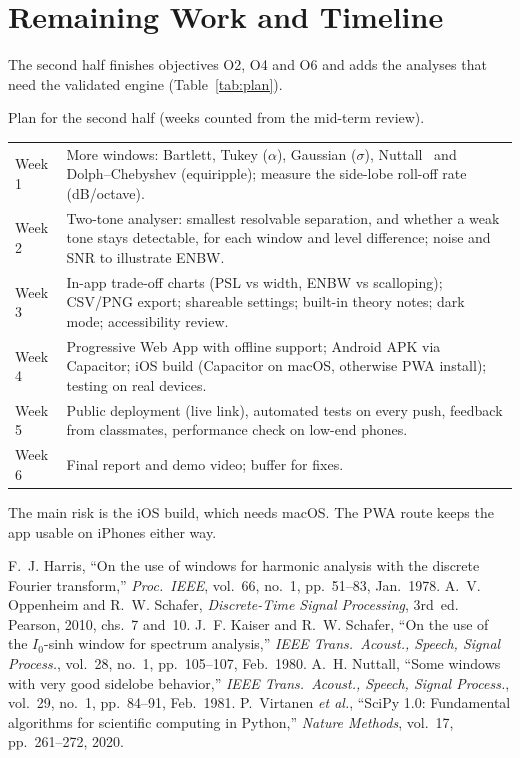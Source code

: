 \documentclass[11pt,a4paper]{article}
\makeatletter
\newenvironment{fixedtable}{\par\noindent\begin{minipage}{\linewidth}\centering\def\@captype{table}}%
  {\end{minipage}\par\medskip}
\makeatother
\begin{document}
\section{Remaining Work and Timeline}
The second half finishes objectives O2, O4 and O6 and adds the analyses that need the
validated engine (Table~\ref{tab:plan}).

\begin{fixedtable}
  \small
  \caption{Plan for the second half (weeks counted from the mid-term review).}
  \label{tab:plan}
  \begin{tabularx}{\linewidth}{lY}
    \hline
    Week 1 & More windows: Bartlett, Tukey ($\alpha$), Gaussian ($\sigma$), Nuttall~\cite{nuttall} and
             Dolph--Chebyshev (equiripple); measure the side-lobe roll-off rate (dB/octave). \\
    Week 2 & Two-tone analyser: smallest resolvable separation, and whether a weak tone stays
             detectable, for each window and level difference; noise and SNR to illustrate ENBW. \\
    Week 3 & In-app trade-off charts (PSL vs width, ENBW vs scalloping); CSV/PNG export; shareable
             settings; built-in theory notes; dark mode; accessibility review. \\
    Week 4 & Progressive Web App with offline support; Android APK via Capacitor; iOS build
             (Capacitor on macOS, otherwise PWA install); testing on real devices. \\
    Week 5 & Public deployment (live link), automated tests on every push, feedback from classmates,
             performance check on low-end phones. \\
    Week 6 & Final report and demo video; buffer for fixes. \\
    \hline
  \end{tabularx}
\end{fixedtable}
The main risk is the iOS build, which needs macOS. The PWA route keeps the app usable on
iPhones either way.

\begin{thebibliography}{9}
   F.~J. Harris, ``On the use of windows for harmonic analysis with the discrete
    Fourier transform,'' \emph{Proc.\ IEEE}, vol.~66, no.~1, pp.~51--83, Jan.~1978.
   A.~V. Oppenheim and R.~W. Schafer, \emph{Discrete-Time Signal Processing},
    3rd~ed. Pearson, 2010, chs.~7 and~10.
   J.~F. Kaiser and R.~W. Schafer, ``On the use of the $I_0$-sinh window for
    spectrum analysis,'' \emph{IEEE Trans.\ Acoust., Speech, Signal Process.}, vol.~28, no.~1,
    pp.~105--107, Feb.~1980.
   A.~H. Nuttall, ``Some windows with very good sidelobe behavior,''
    \emph{IEEE Trans.\ Acoust., Speech, Signal Process.}, vol.~29, no.~1, pp.~84--91, Feb.~1981.
   P.~Virtanen \emph{et al.}, ``SciPy 1.0: Fundamental algorithms for scientific
    computing in Python,'' \emph{Nature Methods}, vol.~17, pp.~261--272, 2020.
\end{thebibliography}
\end{document}
